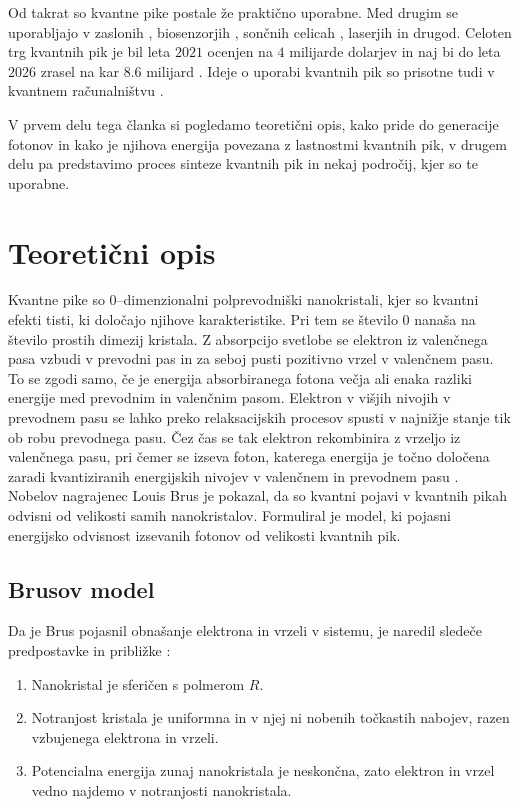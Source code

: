 \documentclass[twoside,11pt]{article}
\begin{document}
Od takrat so kvantne pike postale že praktično uporabne. Med drugim se uporabljajo v zaslonih \cite{https://doi.org/10.1002/anie.202004857, doi:10.1021/acs.chemrev.2c00695}, biosenzorjih \cite{doi:10.1126/science.281.5385.2013}, sončnih celicah \cite{doi:10.1021/jz400052e}, laserjih \cite{laser} in drugod. 
Celoten trg kvantnih pik je bil leta $2021$ ocenjen na $4$ milijarde dolarjev in naj bi do leta $2026$ zrasel na kar $8.6$ milijard \cite{market}. Ideje o uporabi kvantnih pik so prisotne tudi v kvantnem računalništvu \cite{PhysRevA.57.120}.

V prvem delu tega članka si pogledamo teoretični opis, kako pride do generacije fotonov in kako je njihova energija povezana
z lastnostmi kvantnih pik, v drugem delu pa predstavimo proces sinteze kvantnih pik in nekaj področij, kjer so te uporabne.
 
\section{Teoretični opis}
\label{sec:teoretični_opis}
Kvantne pike so $0$--dimenzionalni polprevodniški nanokristali, kjer so kvantni efekti tisti, ki določajo njihove karakteristike. Pri tem se število $0$ nanaša na število prostih dimezij kristala. Z absorpcijo svetlobe se elektron iz valenčnega pasa vzbudi v
prevodni pas in za seboj pusti pozitivno vrzel v valenčnem pasu. To se zgodi samo, če je energija absorbiranega fotona večja ali enaka razliki energije med prevodnim in valenčnim pasom.
Elektron v višjih nivojih v prevodnem pasu se lahko preko relaksacijskih procesov spusti v najnižje stanje tik ob robu prevodnega pasu. Čez čas se tak elektron rekombinira z vrzeljo iz valenčnega pasu, pri čemer se izseva
foton, katerega energija je točno določena zaradi kvantiziranih energijskih nivojev v valenčnem in prevodnem pasu \cite{basic}. Nobelov nagrajenec Louis Brus je pokazal, da so
kvantni pojavi v kvantnih pikah odvisni od velikosti samih nanokristalov. Formuliral je model, ki pojasni energijsko odvisnost izsevanih fotonov
od velikosti kvantnih pik.

\subsection{Brusov model}
Da je Brus pojasnil obnašanje elektrona in vrzeli v sistemu, je naredil sledeče predpostavke in približke \cite{doi:10.1021/ed079p1094}:
\begin{enumerate}
   \item Nanokristal je sferičen s polmerom $R$.
   \item Notranjost kristala je uniformna in v njej ni nobenih točkastih nabojev, razen vzbujenega elektrona in vrzeli.
   \item Potencialna energija zunaj nanokristala je neskončna, zato elektron in vrzel vedno najdemo v notranjosti nanokristala.
\end{enumerate}
\end{document}
